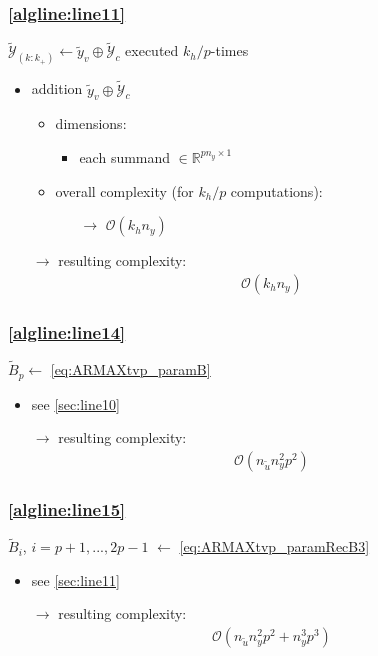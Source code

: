 \documentclass{article}
\begin{document}
\subsubsection{\cref{algline:line11}} 
$\tilde{\mathcal{Y}}_{(k:k_+)} \gets \tilde{y}_v \oplus \tilde{\mathcal{Y}}_c$ 
executed $k_h/p$-times
\begin{itemize}
    \item addition $\tilde{y}_v \oplus \tilde{\mathcal{Y}}_c$
    \begin{itemize}
        \item dimensions:
        \begin{itemize}
            \item each summand $\in \mathbb{R}^{pn_y \times 1}$
        \end{itemize}
        \item overall complexity (for $k_h/p$ computations):
        \begin{itemize}
            \item[$\rightarrow$] $\mathcal{O}(k_h n_y)$
        \end{itemize}
    \end{itemize}    
    \item[$\rightarrow$] resulting complexity: \begin{align*}
        \mathcal{O}(k_h n_y)
    \end{align*}
\end{itemize}

\subsubsection{\cref{algline:line14}} 
$\tilde{B}_p \gets$ \cref{eq:ARMAXtvp_paramB} 
\begin{itemize}
    \item see \cref{sec:line10}
    \item[$\rightarrow$] resulting complexity: 
    \begin{align*}
        \mathcal{O}(n_{\tilde{u}} n_y^2 p^2)
    \end{align*}
\end{itemize}

\subsubsection{\cref{algline:line15}} 
$\tilde{B}_i$, {\small $i=p+1,...,2p-1$} $\gets$ \cref{eq:ARMAXtvp_paramRecB3}
\begin{itemize}
    \item see \cref{sec:line11}
    \item[$\rightarrow$] resulting complexity: 
    \begin{align*}
        \mathcal{O}(n_{\tilde{u}} n_y^2 p^2 + n_y^3 p^3)
    \end{align*}
\end{itemize}
\end{document}

